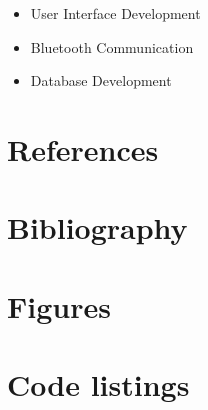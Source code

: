 \documentclass[12pt,a4paper]{article}
\begin{document}
   \begin{itemize}
    \item User Interface Development
    \item Bluetooth Communication
    \item Database Development
   \end{itemize}
    
    \section{References}
    \newpage

    \section{Bibliography}
    \newpage

    \section{Figures}
    \listoffigures
    \newpage

    \section{Code listings}
    \lstlistoflistings
    \newpage
\end{document}
